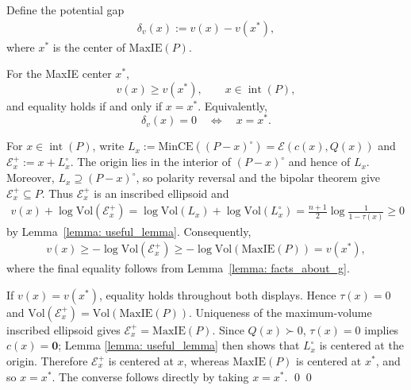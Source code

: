 \documentclass[smallextended]{svjour3}
\let\springerproof\proof
\let\endspringerproof\endproof
\renewenvironment{proof}{\springerproof}{%
  \ifhmode\qed\else\leavevmode\qed\fi\endspringerproof}
\newcommand{\V}{{\mathrm{Vol}}}
\newcommand{\E}{\mathcal{E}}
\newcommand{\MaxIE}{\mathrm{MaxIE}}
\begin{document}
Define the potential gap
\begin{align}\label{eq: v_gap}
    \delta_v(x) := v(x) - v(x^*),
\end{align}
where $x^*$ is the center of $\MaxIE(P)$.
\begin{lemma}\label{lemma: unique_minimizer_v}
For the MaxIE center $x^*$,
\[
    v(x)\ge v(x^*), \qquad x\in \operatorname{int}(P),
\]
and equality holds if and only if $x=x^*$. Equivalently,
\[
    \delta_v(x)=0 \quad\Longleftrightarrow\quad x=x^*.
\]
\end{lemma}
\begin{proof}
For $x\in\operatorname{int}(P)$, write $ L_x:=\mathrm{MinCE}((P-x)^\circ)=\E(c(x),Q(x))$ and $\E_x^+:=x+L_x^\circ$.
The origin lies in the interior of $(P-x)^\circ$ and hence of $L_x$.
Moreover, $L_x\supseteq(P-x)^\circ$, so polarity reversal and the bipolar
theorem give $\E_x^+\subseteq P$. Thus $\E_x^+$ is an inscribed ellipsoid and
\begin{align*}
    v(x)+\log\V(\E_x^+)
    =\log\V(L_x)+\log\V(L_x^\circ) =\frac{n+1}{2}\log\frac{1}{1-\tau(x)}\geq0
\end{align*}
by Lemma~\ref{lemma: useful_lemma}. Consequently,
\begin{align*}
    v(x)
    \geq-\log\V(\E_x^+)
    \geq-\log\V(\MaxIE(P))
    =v(x^*),
\end{align*}
where the final equality follows from Lemma~\ref{lemma: facts_about_g}.

If $v(x)=v(x^*)$, equality holds throughout both displays. Hence
$\tau(x)=0$ and $\V(\E_x^+)=\V(\MaxIE(P))$. Uniqueness of the
maximum-volume inscribed ellipsoid gives $\E_x^+=\MaxIE(P)$. Since
$Q(x)\succ0$, $\tau(x)=0$ implies $c(x)=\mathbf0$; Lemma
\ref{lemma: useful_lemma} then shows that $L_x^\circ$ is centered at the
origin. Therefore $\E_x^+$ is centered at $x$, whereas $\MaxIE(P)$ is centered
at $x^*$, and so $x=x^*$. The converse follows directly by taking $x=x^*$.
\end{proof}
\end{document}
